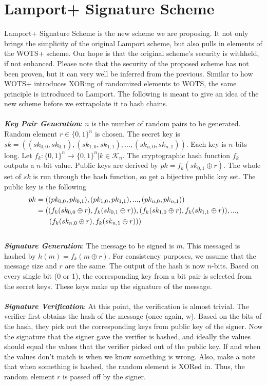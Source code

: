 \documentclass[]{scrartcl}
\makeatletter
\newcommand{\mathleft}{\@fleqntrue\@mathmargin0pt}
\makeatother
\begin{document}
\section*{Lamport+ Signature Scheme}
Lamport+ Signature Scheme is the new scheme we are proposing. It not only brings the simplicity of the original Lamport scheme, but also pulls in elements of the WOTS+ scheme. Our hope is that the original scheme's security is withheld, if not enhanced. Please note that the security of the proposed scheme has not been proven, but it can very well be inferred from the previous. Similar to how WOTS+ introduces XORing of randomized elements to WOTS, the same principle is introduced to Lamport. The following is meant to give an idea of the new scheme before we extrapolate it to hash chains.\\ \\
\textbf{\textit{Key Pair Generation}}: $n$ is the number of random pairs to be generated. Random element $r \in \{0,1\}^n$ is chosen. The secret key is $sk = ((sk_{0,0}, sk_{0,1}),(sk_{1,0}, sk_{1,1}),...,(sk_{n,0}, sk_{n,1}))$. Each key is $n$-bits long. Let $f_k : \{0,1\}^n \rightarrow \{0,1\}^n | k \in \mathcal{K}_n$. The cryptographic hash function $f_k$ outputs a $n$-bit value. Public keys are derived by $pk = f_k(sk_{0,1} \oplus r)$. The whole set of $sk$ is run through the hash function, so get a bijective public key set. The public key is the following 
\mathleft
\begin{equation}
\begin{split}
pk & = ((pk_{0,0}, pk_{0,1}),(pk_{1,0}, pk_{1,1}),...,(pk_{n,0}, pk_{n,1})) \\
& = ((f_k(sk_{0,0} \oplus r), f_k(sk_{0,1}\oplus r)),(f_k(sk_{1,0} \oplus r), f_k(sk_{1,1}\oplus r)),...,\\
& \hspace{0.65cm}(f_k(sk_{n,0} \oplus r), f_k(sk_{n,1}\oplus r)))
\end{split}
\end{equation} \\
\textbf{\textit{Signature Generation}}: The message to be signed is $m$. This messaged is hashed by $h(m) = f_k(m \oplus r)$. For consistency purposes, we assume that the message size and $r$ are the same. The output of the hash is now $n$-bits. Based on every single bit (0 or 1), the corresponding key from a bit pair is selected from the secret keys. These keys make up the signature of the message.\\ \\
\textbf{\textit{Signature Verification}}: At this point, the verification is almost trivial. The verifier first obtains the hash of the message (once again, w). Based on the bits of the hash, they pick out the corresponding keys from public key of the signer. Now the signature that the signer gave the verifier is hashed, and ideally the values should equal the values that the verifier picked out of the public key. If and when the values don't match is when we know something is wrong. Also, make a note that when something is hashed, the random element is XORed in. Thus, the random element $r$ is passed off by the signer.
\end{document}
